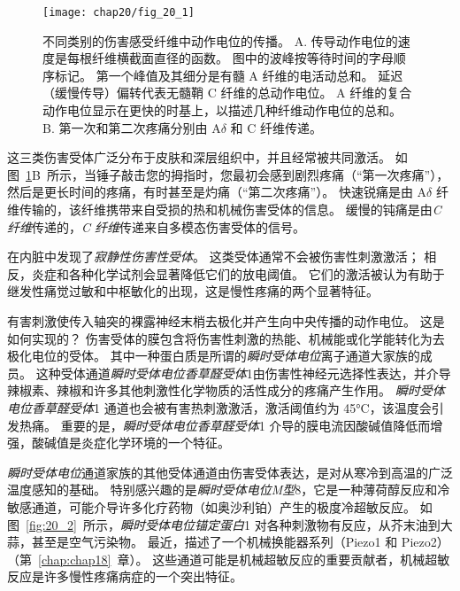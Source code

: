 \begin{figure}[htbp]
	\centering
	\texttt{[image: chap20/fig\_20\_1]}
	\caption{不同类别的伤害感受纤维中动作电位的传播。 
		A. 传导动作电位的速度是每根纤维横截面直径的函数。
		图中的波峰按等待时间的字母顺序标记。
		第一个峰值及其细分是有髓 A 纤维的电活动总和。
		延迟（缓慢传导）偏转代表无髓鞘 C 纤维的总动作电位。
		A 纤维的复合动作电位显示在更快的时基上，以描述几种纤维动作电位的总和\cite{perl2007ideas}。
		B. 第一次和第二次疼痛分别由 A$\delta$ 和 C 纤维传递\cite{fields1987painful}。}
	\label{fig:20_1}
\end{figure}


这三类伤害受体广泛分布于皮肤和深层组织中，并且经常被共同激活。
如图~\ref{fig:20_1}B~所示，当锤子敲击您的拇指时，您最初会感到剧烈疼痛（“第一次疼痛”），然后是更长时间的疼痛，有时甚至是灼痛（“第二次疼痛”）。
快速锐痛是由 A$ \delta $ 纤维传输的，该纤维携带来自受损的热和机械伤害受体的信息。
缓慢的钝痛是由\textit{C 纤维}传递的，\textit{C 纤维}传递来自多模态伤害受体的信号。


在内脏中发现了\textit{寂静性伤害性受体}。
这类受体通常不会被伤害性刺激激活；
相反，炎症和各种化学试剂会显著降低它们的放电阈值。
它们的激活被认为有助于继发性痛觉过敏和中枢敏化的出现，这是慢性疼痛的两个显著特征。


有害刺激使传入轴突的裸露神经末梢去极化并产生向中央传播的动作电位。
这是如何实现的？
伤害受体的膜包含将伤害性刺激的热能、机械能或化学能转化为去极化电位的受体。
其中一种蛋白质是所谓的\textit{瞬时受体电位}离子通道大家族的成员。
这种受体通道\textit{瞬时受体电位香草醛受体}1由伤害性神经元选择性表达，并介导辣椒素、辣椒和许多其他刺激性化学物质的活性成分的疼痛产生作用。
\textit{瞬时受体电位香草醛受体}1 通道也会被有害热刺激激活，激活阈值约为 45°C，该温度会引发热痛。
重要的是，\textit{瞬时受体电位香草醛受体}1 介导的膜电流因酸碱值降低而增强，酸碱值是炎症化学环境的一个特征。


\textit{瞬时受体电位}通道家族的其他受体通道由伤害受体表达，是对从寒冷到高温的广泛温度感知的基础。
特别感兴趣的是\textit{瞬时受体电位M型}8，它是一种薄荷醇反应和冷敏感通道，可能介导许多化疗药物（如奥沙利铂）产生的极度冷超敏反应。
如图~\ref{fig:20_2}~所示，\textit{瞬时受体电位锚定蛋白}1 对各种刺激物有反应，从芥末油到大蒜，甚至是空气污染物。
最近，描述了一个机械换能器系列（Piezo1 和 Piezo2）（第~\ref{chap:chap18}~章）。
这些通道可能是机械超敏反应的重要贡献者，机械超敏反应是许多慢性疼痛病症的一个突出特征。


